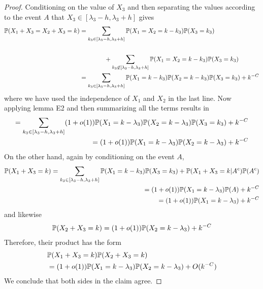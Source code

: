 \begin{appendices}
\begin{proof}
Conditioning on the value of $X_3$ and then separating the values according to the event $A$ that $X_3 \in [\lambda_3-h,\lambda_3 +h]$ gives
\begin{align*}
\mathbb{P}( X_1+X_3 = X_2 + X_3 =k) &= \sum_{k_3 \in [\lambda_3-h,\lambda_3+h]} \mathbb{P}(X_1=X_2=k-k_3)\mathbb{P}(X_3=k_3) \\
 \\ &\qquad \qquad+ \sum_{k_3 \not \in [\lambda_3-h,\lambda_3+h]} \mathbb{P}(X_1=X_2=k-k_3)\mathbb{P}(X_3=k_3) \\
&=\sum_{k_3 \in [\lambda_3-h,\lambda_3+h]} \mathbb{P}(X_1=k-k_3)\mathbb{P}(X_2=k-k_3)\mathbb{P}(X_3=k_3) + k^{-C}
\end{align*}
where we have used the independence of $X_1$ and $X_2$ in the last line. Now applying lemma E2  and then summarizing all the terms results in
\begin{align*}
=\sum_{k_3 \in [\lambda_3-h,\lambda_3+h]} (1+o(1))\mathbb{P}(X_1=k-\lambda_3)\mathbb{P}(X_2=k-\lambda_3)\mathbb{P}(X_3=k_3) +k^{-C} \\
= (1+o(1)) \mathbb{P}( X_1 =k- \lambda_3 ) \mathbb{P}(  X_2 = k-\lambda_3) +k^{-C}
\end{align*}
On the other hand, again by conditioning on the event $A$,
\begin{align*}
\mathbb{P}(X_1+X_3=k) = \sum_{k_3 \in [\lambda_3-h,\lambda_3+h]} \mathbb{P}(X_1=k-k_3)\mathbb{P}(X_3 = k_3)+\mathbb{P}(X_1+X_3=k|A^c)\mathbb{P}(A^c)\\
 = (1+o(1))\mathbb{P}(X_1=k- \lambda_3)\mathbb{P}(A) +k^{-C} \\
 =(1+o(1))\mathbb{P}(X_1=k-\lambda_3)+k^{-C}
\end{align*}
and likewise
\begin{align*}
\mathbb{P}(X_2+X_3=k)
 = (1+o(1))\mathbb{P}(X_2=k- \lambda_3) +k^{-C}
\end{align*}
Therefore, their product has the form
\begin{align*}
&\mathbb{P}(X_1+X_3=k)\mathbb{P}(X_2+X_3=k) \\
&= (1+o(1))\mathbb{P}(X_1=k-\lambda_3)\mathbb{P}(X_2=k-\lambda_3)+O(k^{-C})
\end{align*}
We conclude that both sides in the claim agree.
\end{proof}
\end{appendices}